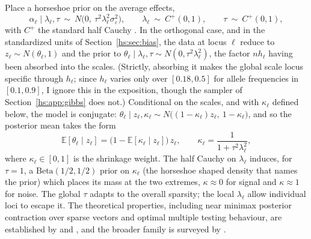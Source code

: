 Place a horseshoe prior on the average effects,
\begin{equation}
\alpha_\ell \mid \lambda_\ell, \tau \ \sim\ N\big(0,\ \tau^2\lambda_\ell^2\sigma^2_\varepsilon\big),
\qquad
\lambda_\ell \ \sim\ C^{+}(0,1),
\qquad
\tau \ \sim\ C^{+}(0,1),
\label{hs:eq:hs}
\end{equation}
with $C^{+}$ the standard half Cauchy \citep{hs:carvalho2010horseshoe,hs:polson2012local}. In the orthogonal case, and in the standardized units of Section~\ref{hs:sec:bias}, the data at locus $\ell$ reduce to $z_\ell \sim N(\theta_\ell,1)$ and the prior to $\theta_\ell\mid\lambda_\ell,\tau \sim N(0,\tau^2\lambda_\ell^2)$, the factor $nh_\ell$ having been absorbed into the scales. (Strictly, absorbing it makes the global scale locus specific through $h_\ell$; since $h_\ell$ varies only over $[0.18, 0.5]$ for allele frequencies in $[0.1,0.9]$, I ignore this in the exposition, though the sampler of Section~\ref{hs:app:gibbs} does not.) Conditional on the scales, and with $\kappa_\ell$ defined below, the model is conjugate: $\theta_\ell\mid z_\ell,\kappa_\ell \sim N\big((1-\kappa_\ell)z_\ell,\ 1-\kappa_\ell\big)$, and so the posterior mean takes the form
\[
\mathbb{E}[\theta_\ell \mid z_\ell] = \big(1 - \mathbb{E}[\kappa_\ell \mid z_\ell]\big)\, z_\ell,
\qquad
\kappa_\ell = \frac{1}{1+\tau^2\lambda_\ell^2},
\]
where $\kappa_\ell \in [0,1]$ is the shrinkage weight. The half Cauchy on $\lambda_\ell$ induces, for $\tau = 1$, a $\mathrm{Beta}(1/2,1/2)$ prior on $\kappa_\ell$ (the horseshoe shaped density that names the prior) which places its mass at the two extremes, $\kappa \approx 0$ for signal and $\kappa \approx 1$ for noise. The global $\tau$ adapts to the overall sparsity; the local $\lambda_\ell$ allow individual loci to escape it. The theoretical properties, including near minimax posterior contraction over sparse vectors and optimal multiple testing behaviour, are established by \citet{hs:vanderpas2014horseshoe} and \citet{hs:datta2013asymptotic}, and the broader family is surveyed by \citet{hs:bhadra2019lasso}.

